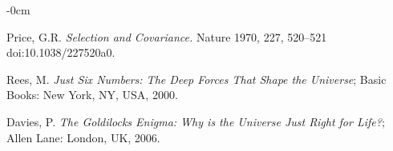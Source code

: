 \documentclass[life,article,submit,pdftex,moreauthors]{Definitions/mdpi}
\begin{document}
\begin{adjustwidth}{-\extralength}{0cm}
{\begin{thebibliography}{999}
Price, G.R. \textit{Selection and Covariance.} Nature 1970, 227, 520–521 doi:10.1038/227520a0.

Rees, M. \textit{Just Six Numbers: The Deep Forces That Shape the Universe}; Basic Books: New York, NY, USA, 2000.

Davies, P. \textit{The Goldilocks Enigma: Why is the Universe Just Right for Life?}; Allen Lane: London, UK, 2006.

\end{thebibliography}
}



%


\PublishersNote{}
\end{adjustwidth}
\end{document}
